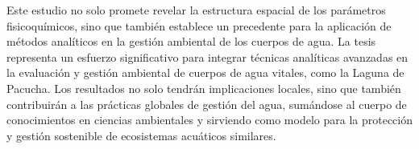 Este estudio no solo promete revelar la estructura espacial de los parámetros fisicoquímicos, sino que también establece un precedente para la aplicación de métodos analíticos en la gestión ambiental de los cuerpos de agua. La tesis representa un esfuerzo significativo para integrar técnicas analíticas avanzadas en la evaluación y gestión ambiental de cuerpos de agua vitales, como la Laguna de Pacucha. Los resultados no solo tendrán implicaciones locales, sino que también contribuirán a las prácticas globales de gestión del agua, sumándose al cuerpo de conocimientos en ciencias ambientales y sirviendo como modelo para la protección y gestión sostenible de ecosistemas acuáticos similares.
